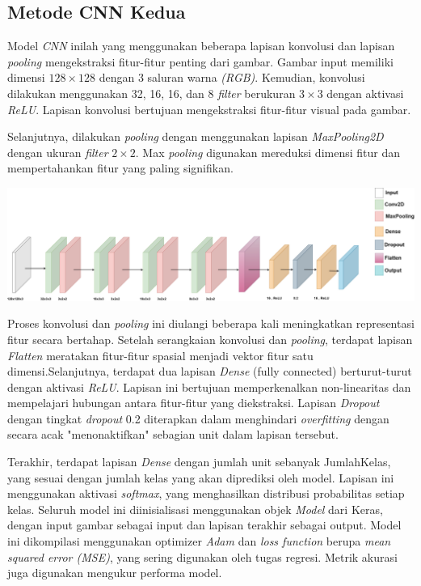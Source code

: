 \subsection{Metode CNN Kedua}
Model \textit{CNN} inilah yang menggunakan beberapa lapisan konvolusi dan lapisan \textit{pooling} mengekstraksi fitur-fitur penting dari gambar. Gambar input memiliki dimensi $128 \times 128$ dengan 3 saluran warna \textit{(RGB)}. Kemudian, konvolusi dilakukan menggunakan 32, 16, 16, dan 8 \textit{filter} berukuran $3 \times 3$ dengan aktivasi \textit{ReLU}. Lapisan konvolusi bertujuan mengekstraksi fitur-fitur visual pada gambar.

Selanjutnya, dilakukan \textit{pooling} dengan menggunakan lapisan \textit{MaxPooling2D} dengan ukuran \textit{filter} $2 \times 2$. Max \textit{pooling} digunakan mereduksi dimensi fitur dan mempertahankan fitur yang paling signifikan.

\begin{center}
	\includegraphics[width=1.0\linewidth]{gambar/bener/Arsitektur_CNN2_Revisi.png}
	\label{fig:layerCNN}
\end{center}

Proses konvolusi dan \textit{pooling} ini diulangi beberapa kali meningkatkan representasi fitur secara bertahap. Setelah serangkaian konvolusi dan \textit{pooling}, terdapat lapisan \textit{Flatten} meratakan fitur-fitur spasial menjadi vektor fitur satu dimensi.Selanjutnya, terdapat dua lapisan \textit{Dense} (fully connected) berturut-turut dengan aktivasi \textit{ReLU}. Lapisan ini bertujuan memperkenalkan non-linearitas dan mempelajari hubungan antara fitur-fitur yang diekstraksi. Lapisan \textit{Dropout} dengan tingkat \textit{dropout} 0.2 diterapkan dalam menghindari \textit{overfitting} dengan secara acak "menonaktifkan" sebagian unit dalam lapisan tersebut.

Terakhir, terdapat lapisan \textit{Dense} dengan jumlah unit sebanyak JumlahKelas, yang sesuai dengan jumlah kelas yang akan diprediksi oleh model. Lapisan ini menggunakan aktivasi \textit{softmax}, yang menghasilkan distribusi probabilitas setiap kelas. Seluruh model ini diinisialisasi menggunakan objek \textit{Model} dari Keras, dengan input gambar sebagai input dan lapisan terakhir sebagai output. Model ini dikompilasi menggunakan optimizer \textit{Adam} dan \textit{loss function} berupa \textit{mean squared error (MSE)}, yang sering digunakan oleh tugas regresi. Metrik akurasi juga digunakan mengukur performa model.


